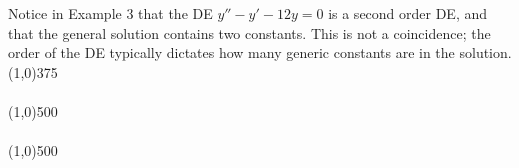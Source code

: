 \documentclass[12pt]{article}
\newcommand{\<}{\langle}
\renewcommand{\>}{\rangle}
\begin{document}
\noindent  Notice in Example 3 that the DE $y'' - y' - 12y = 0$ is a second order DE, and that the
general solution contains two constants.  This is not a coincidence; the order of the DE 
typically dictates how many generic constants are in the solution.  \line(1,0){375}\\ \\
\line(1,0){500}\\ \\
\line(1,0){500}\\
\end{document}
